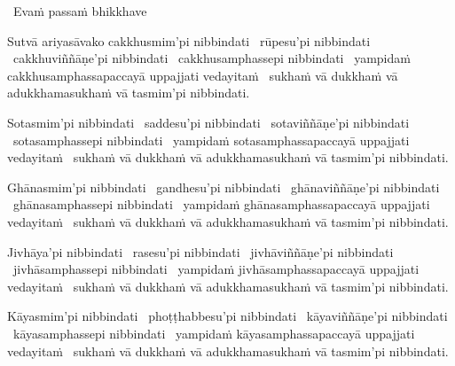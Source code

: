 \begin{leader-only}
  \anglebracketleft\ \hspace{-0.5mm}Evaṁ passaṁ bhikkhave \hspace{-0.5mm}\anglebracketright\
\end{leader-only}

\vspace{-0.99em} %

\begin{pali-hang}
  Sutvā ariyasāvako cakkhusmim'pi nibbindati \breathmark\ rūpesu'pi nibbindati \breathmark\ cakkhuviññāṇe'pi nibbindati \breathmark\ cakkhusamphassepi nibbindati \breathmark\ yampidaṁ cakkhusamphassapaccayā uppajjati vedayitaṁ \breathmark\ sukhaṁ vā dukkhaṁ vā adukkhamasukhaṁ vā tasmim'pi nibbindati.
\end{pali-hang}

\begin{pali-hang}
  Sotasmim'pi nibbindati \breathmark\ saddesu'pi nibbindati \breathmark\ sotaviññāṇe'pi nibbindati \breathmark\ sotasamphassepi nibbindati \breathmark\ yampidaṁ sotasamphassapaccayā uppajjati vedayitaṁ \breathmark\ sukhaṁ vā dukkhaṁ vā adukkhamasukhaṁ vā tasmim'pi nibbindati.
\end{pali-hang}

\begin{pali-hang}
  Ghānasmim'pi nibbindati \breathmark\ gandhesu'pi nibbindati \breathmark\ ghānaviññāṇe'pi nibbindati \breathmark\ ghānasamphassepi nibbindati \breathmark\ yampidaṁ ghānasamphassapaccayā uppajjati vedayitaṁ \breathmark\ sukhaṁ vā dukkhaṁ vā adukkhamasukhaṁ vā tasmim'pi nibbindati.
\end{pali-hang}

\begin{pali-hang}
  Jivhāya'pi nibbindati \breathmark\ rasesu'pi nibbindati \breathmark\ jivhāviññāṇe'pi nibbindati \breathmark\ jivhāsamphassepi nibbindati \breathmark\ yampidaṁ jivhāsamphassapaccayā uppajjati vedayitaṁ \breathmark\ sukhaṁ vā dukkhaṁ vā adukkhamasukhaṁ vā tasmim'pi nibbindati.
\end{pali-hang}

\begin{pali-hang}
  Kāyasmim'pi nibbindati \breathmark\ phoṭṭhabbesu'pi nibbindati \breathmark\ kāyaviññāṇe'pi nibbindati \breathmark\ kāyasamphassepi nibbindati \breathmark\ yampidaṁ kāyasamphassapaccayā uppajjati vedayitaṁ \breathmark\ sukhaṁ vā dukkhaṁ vā adukkhamasukhaṁ vā tasmim'pi nibbindati.
\end{pali-hang}

